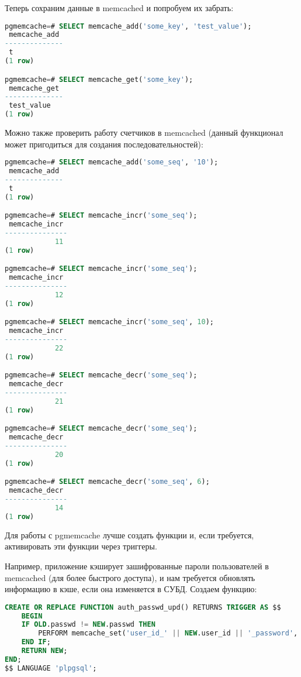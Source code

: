 Теперь сохраним данные в memcached и попробуем их забрать:

\begin{lstlisting}[language=SQL,label=lst:pgcache9,caption=Проверка]
pgmemcache=# SELECT memcache_add('some_key', 'test_value');
 memcache_add
--------------
 t
(1 row)

pgmemcache=# SELECT memcache_get('some_key');
 memcache_get
--------------
 test_value
(1 row)

\end{lstlisting}

Можно также проверить работу счетчиков в memcached (данный функционал может пригодиться для создания последовательностей):

\begin{lstlisting}[language=SQL,label=lst:pgcache10,caption=Проверка]
pgmemcache=# SELECT memcache_add('some_seq', '10');
 memcache_add
--------------
 t
(1 row)

pgmemcache=# SELECT memcache_incr('some_seq');
 memcache_incr
---------------
            11
(1 row)

pgmemcache=# SELECT memcache_incr('some_seq');
 memcache_incr
---------------
            12
(1 row)

pgmemcache=# SELECT memcache_incr('some_seq', 10);
 memcache_incr
---------------
            22
(1 row)

pgmemcache=# SELECT memcache_decr('some_seq');
 memcache_decr
---------------
            21
(1 row)

pgmemcache=# SELECT memcache_decr('some_seq');
 memcache_decr
---------------
            20
(1 row)

pgmemcache=# SELECT memcache_decr('some_seq', 6);
 memcache_decr
---------------
            14
(1 row)

\end{lstlisting}

Для работы с pgmemcache лучше создать функции и, если требуется, активировать эти функции через триггеры.

Например, приложение кэширует зашифрованные пароли пользователей в memcached (для более быстрого доступа), и нам требуется обновлять информацию в кэше, если она изменяется в СУБД. Создаем функцию:

\begin{lstlisting}[language=SQL,label=lst:pgcache11,caption=Функция для обновления данных в кэше]
CREATE OR REPLACE FUNCTION auth_passwd_upd() RETURNS TRIGGER AS $$
	BEGIN
	IF OLD.passwd != NEW.passwd THEN
		PERFORM memcache_set('user_id_' || NEW.user_id || '_password', NEW.passwd);
	END IF;
	RETURN NEW;
END;
$$ LANGUAGE 'plpgsql';
\end{lstlisting}

